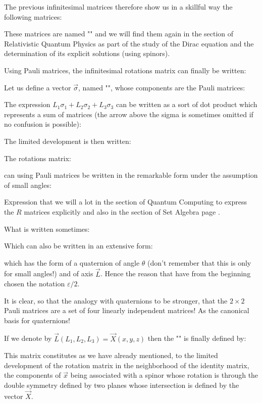 	The previous infinitesimal matrices therefore show us in a skillful way the following matrices:
	
	These matrices are named "\label{pauli matrices origin}" and we will find them again in the section of Relativistic Quantum Physics as part of the study of the Dirac equation and the determination of its explicit solutions (using spinors).
	
	Using Pauli matrices, the infinitesimal rotations matrix can finally be written:
	
	Let us define a vector $\vec{\sigma}$, named "", whose components are the Pauli matrices:
	
	The expression $L_1\sigma_1+L_2\sigma_2+L_3\sigma_3$ can be written as a sort of dot product which represents a sum of matrices\label{spinor dot product} (the arrow above the sigma is sometimes omitted if no confusion is possible):
	
	The limited development is then written:
	
	The rotations matrix:
	
	can using Pauli matrices be written in the remarkable form under the assumption of small angles:
	
	Expression that we will a lot in the section of Quantum Computing to express the $R$ matrices explicitly and also in the section of Set Algebra page \pageref{set algebra}.
	
	What is written sometimes:
	
	Which can also be written in an extensive form:
	
	which has the form of a quaternion of angle $\theta$ (don't remember that this is only for small angles!) and of axis $\vec{L}$. Hence the reason that  have from the beginning chosen the notation $\varepsilon/2$.
	
	It is clear, so that the analogy with quaternions to be stronger, that the $2\times 2$ Pauli matrices are a set of four linearly independent matrices! As the canonical basis for quaternions!
	
	If we denote by $\vec{L}(L_1,L_2,L_3)=\vec{X}(x,y,z)$  then the "" is finally defined by:
	
	This matrix constitutes as we have already mentioned, to the limited development of the rotation matrix in the neighborhood of the identity matrix, the components of $\vec{x}$ being associated with a spinor whose rotation is through the double symmetry defined by two planes whose intersection is defined by the vector $\vec{X}$.
	

